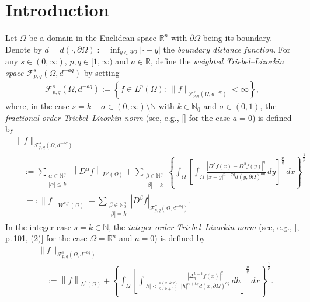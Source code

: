 \documentclass[11pt,twoside]{article}
\def\rr{{\mathbb R}}
\def\rn{{\mathbb{R}^n}}
\def\nn{{\mathbb N}}
\def\nno{\nn_0}
\def\fz{\infty }
\def\az{\alpha}
\def\boz{{\Omega}}
\def\sz{\sigma}
\def\pa{\partial}                %
\theoremstyle{mylem}
\theoremstyle{definition}
\numberwithin{equation}{section}
\begin{document}
\vspace{0.2cm}

\tableofcontents

\section{Introduction}

Let $\Omega$ be a domain in the Euclidean space $\rn$
with $\pa\boz$ being its boundary.  Denote by $d=d(\cdot,\partial\Omega):=\inf_{y\in\pa\boz}|\cdot-y|$
the \emph{boundary distance function}.
For any $s\in(0,\infty)$, 
$p,q\in[1,\fz)$ and $a\in\rr$,  define the \emph{weighted Triebel--Lizorkin space}
$\mathcal{F}_{p, q}^{s}(\boz,d^{-aq})$ by setting  
\begin{align}\label{eqn-TLs1}
\mathcal{F}_{p, q}^{s}(\boz,d^{-aq}):=\left\{f\in L^p(\boz): \ \|f\|_{\mathcal{F}_{p, q}^{s}(\boz,d^{-aq})}<\fz\right\},
\end{align}
where, in the case $s=k+\sigma\in (0,\infty)\setminus \nn$ with $k\in\nn_0$ and $\sigma\in (0,1)$, the
\emph{fractional-order Triebel--Lizorkin norm} (see, e.g.,  [\cite{p2019}] for the case $a=0$) is defined by 
\begin{align}\label{eqn-1.3}
&\|f\|_{\mathcal F_{p,q}^s(\Omega,d^{-aq})}\nonumber\\
&\quad:=\sum_{\substack{\az\in {\nno^n} \\ |\alpha| \leq k}}\left\| D^{\alpha}f \right\|_{L^p(\Omega)}
+\sum_{\substack{\beta\in {\nno^n} \\ |\beta|=k }}\left\{\int_{\Omega} \left[\int_{\Omega} 
\frac{|D^\beta f(x)-D^\beta f(y)|^q}
{|x - y|^{n+\sigma q}d(y,\pa\boz)^{aq}} \,dy \right]^{\frac{p}{q}}\, dx \right\}^{\frac{1}{p}} \nonumber\\
&\quad\,=:\| f \|_{W^{k,p}(\Omega)} 
+\sum_{\substack{\beta\in {\nno^n} \\ |\beta|=k }}\left|D^\beta f\right|_{\mathcal{F}_{p,q}^{\sz}(\Omega,d^{-aq})}.
\end{align}
In the integer-case $s=k\in\nn$, the \emph{integer-order Triebel--Lizorkin norm} (see, e.g.,  [\cite{t2010}, p.\,101, (2)] for the case $\boz=\rn$ and $a=0$) is defined by 
\begin{align}\label{1614}
&\|f\|_{\mathcal F_{p,q}^s(\boz,d^{-aq})}\nonumber\\
&\quad:=\left\| f \right\|_{L^p(\Omega)}+\left\{
\int_{\boz}
\left[
\int_{|h|<\frac{d(x,\pa\boz)}{2(k+1)} }
\frac{\left|\Delta_h^{k+1}f(x)\right|^q}
{|h|^{n+kq}d(x,\partial \Omega)^{aq}}
\,d h
\right]^\frac{p}{q}
\,d x
\right\}^\frac{1}{p}.
\end{align}
\end{document}
